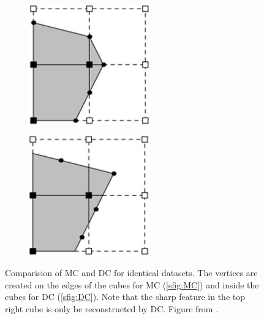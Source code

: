 \begin{figure}
\begin{center}
\begin{subfigure}{.45\textwidth}
\begin{center}
\includegraphics[width=.5\textwidth]{Pictures/SurfaceReconstruction/MC}
\label{sfig:MC}
\end{center}
\end{subfigure}
\begin{subfigure}{.45\textwidth}
\begin{center}
\includegraphics[width=.5\textwidth]{Pictures/SurfaceReconstruction/DC}
\label{sfig:DC}
\end{center}
\end{subfigure}
\caption{Comparision of \ac{MC} and \ac{DC} for identical datasets. The vertices are created on the edges of the cubes for \ac{MC} (\autoref{sfig:MC}) and inside the cubes for \ac{DC} (\autoref{sfig:DC}). Note that the sharp feature in the top right cube is only be reconstructed by \ac{DC}. Figure from \cite{FromVoxelsToPolygons}.}
\label{fig:CompMCDC}
\end{center}
\end{figure}

